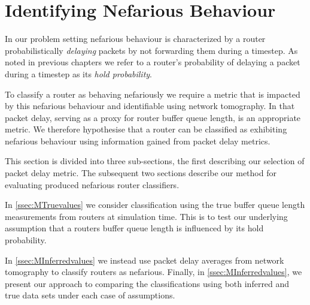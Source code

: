 \section{Identifying Nefarious Behaviour}
\label{sec:MNefidentification}
In our problem setting nefarious behaviour is characterized by a router probabilistically \textit{delaying} packets by not forwarding them during a timestep. As noted in previous chapters we refer to a router's probability of delaying a packet during a timestep as its \textit{hold probability}.\par
To classify a router as behaving nefariously we require a metric that is impacted by this nefarious behaviour and identifiable using network tomography. In that packet delay, serving as a proxy for router buffer queue length, is an appropriate metric. We therefore hypothesise that a router can be classified as exhibiting nefarious behaviour using information gained from packet delay metrics.\par
This section is divided into three sub-sections, the first describing our selection of packet delay metric. The subsequent two sections describe our method for evaluating produced nefarious router classifiers.\par
In \cref{ssec:MTruevalues} we consider classification using the true buffer queue length measurements from routers at simulation time. This is to test our underlying assumption that a routers buffer queue length is influenced by its hold probability.\par
In \cref{ssec:MInferredvalues} we instead use packet delay averages from network tomography to classify routers as nefarious. Finally, in \cref{ssec:MInferredvalues}, we present our approach to comparing the classifications using both inferred and true data sets under each case of assumptions.
  
